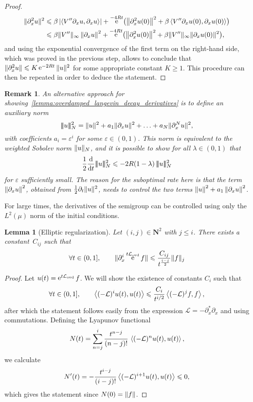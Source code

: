 \documentclass[11pt,a4paper]{article}
\DeclareMathOperator{\e}{e}
\newcommand{\nat}{\mathbf N}
\theoremstyle{plain}
\newtheorem{lemma}{Lemma}[section]
\newtheorem{remark}{Remark}[section]
\numberwithin{equation}{section}
\renewcommand{\leq}{\leqslant}
\renewcommand{\geq}{\geqslant}
\begin{document}
\begin{proof}
    \begin{align*}
        \norm*{\partial_x^2 u}^2
        &\leq \beta \abs{\ip{V'' \partial_x u}{\partial_x u}} + \e^{-4Rt} \bigl( \norm{\partial_x^2 u(0)}^2 + \beta \ip{V'' \partial_x u(0)}{\partial_x u(0)} \bigr) \\
        &\leq \beta \norm*{V''}_{\infty} \norm{\partial_x u}^2 + \e^{-4Rt} \bigl( \norm{\partial_x^2 u(0)}^2 + \beta \norm*{V''}_{\infty} \norm*{\partial_x u(0)}^2 \bigr),
    \end{align*}
    and using the exponential convergence of the first term on the right-hand side,
    which was proved in the previous step,
    allows to conclude that $\norm*{\partial_x^2 u} \leq K \e^{-2 Rt} \norm*{u}^2$ for some appropriate constant $K \geq 1$.
    This procedure can then be repeated in order to deduce the statement.
\end{proof}

\newcommand{\auxnorm}[1]{|\!|\!| #1 |\!|\!|}
\begin{remark}
    An alternative approach for showing~\cref{lemma:overdamped_langevin_decay_derivatives} is
    to define an auxiliary norm
    \[
        \auxnorm{u}_N^2 = \norm*{u}^2 + a_1 \norm*{\partial_x u}^2 + \dotsc + a_N \norm*{\partial_x^N u}^2,
    \]
    with coefficients $a_i = \varepsilon^i$ for some $\varepsilon \in (0, 1)$.
    This norm is equivalent to the weighted Sobolev norm $\norm*{u}_N$,
    and it is possible to show for all $\lambda \in (0, 1)$ that
    \[
        \frac{1}{2}\derivative*{1}{t} \auxnorm{u}_N^2 \leq - 2 R(1 - \lambda) \, \auxnorm{u}_N^2
    \]
    for $\varepsilon$ sufficiently small.
    The reason for the suboptimal rate here is that the term $\norm{\partial_x u}^2$,
    obtained from $\frac{1}{2} \partial_t \norm*{u}^2$,
    needs to control the two terms $\norm{u}^2 + a_1 \norm{\partial_x u}^2$.
\end{remark}

For large times,
the derivatives of the semigroup can be controlled using only the $L^2(\mu)$ norm of the initial conditions.
\begin{lemma}
    [Elliptic regularization]
    \label{lemma:elliptic_reg}
    Let $(i,j) \in \nat^2$ with $j \leq i$.
    There exists a constant~$C_{ij}$ such that
    \[
        \forall t \in (0, 1], \qquad
        \norm*{\partial_x^i \e^{t \mathcal L_{\rm ovd}} f} \leq \frac{C_{ij}}{t^{\frac{i-j}{2}}} \norm*{f}[j]
    \]
\end{lemma}
\begin{proof}
    Let $u(t) = \e^{t \mathcal L_{\rm ovd}} f$.
    We will show the existence of constants $C_i$ such that
    \[
        \forall t \in (0, 1], \qquad
        \ip{(-\mathcal L)^i u(t)}{u(t)}
        \leq \frac{C_i}{t^{i/2}} \ip{(-\mathcal L)^j f}{f},
    \]
    after which the statement follows easily from the expression $\mathcal L = - \partial_x^* \partial_x$ and using commutations.
    Defining the Lyapunov functional
    \[
        N(t) = \sum_{n=j}^{i} \frac{t^{n-j}}{(n-j)!} \, \ip{(-\mathcal L)^n u(t)}{u(t)} ,
    \]
    we calculate
    \[
        N'(t) =  - \frac{t^{i-j}}{(i-j)!} \ip{(- \mathcal L)^{i+1} u(t)}{u(t)} \leq 0,
    \]
    which gives the statement since $N(0) = \norm{f}$.
\end{proof}
\end{document}

